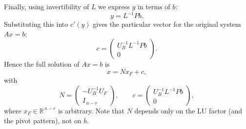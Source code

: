 \documentclass{article}
\begin{document}
Finally, using invertibility of \(L\) we express \(y\) in terms of \(b\):
\[
y=L^{-1}Pb.
\]
Substituting this into \(c'(y)\) gives the particular vector for the original system \(Ax=b\):
\[
c=\begin{pmatrix}U_B^{-1}L^{-1}Pb\\[2pt]0\end{pmatrix}.
\]
Hence the full solution of \(Ax=b\) is
\[
x=N x_F + c,
\]
with
\[
N=\begin{pmatrix}-U_B^{-1}U_F\\[3pt] I_{\,n-r}\end{pmatrix},\qquad
c=\begin{pmatrix}U_B^{-1}L^{-1}Pb\\[3pt]0\end{pmatrix},
\]
where \(x_F\in\mathbb{R}^{\,n-r}\) is arbitrary. Note that \(N\) depends only on the LU factor (and the pivot pattern), not on \(b\).
\end{document}
